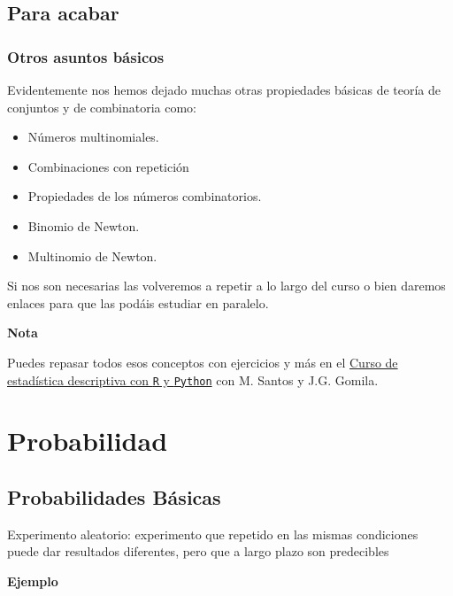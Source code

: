 \documentclass[]{book}
\providecommand{\tightlist}{%
  \setlength{\itemsep}{0pt}\setlength{\parskip}{0pt}}
\begin{document}
\hypertarget{para-acabar}{%
\section{Para acabar}\label{para-acabar}}

\hypertarget{otros-asuntos-buxe1sicos}{%
\subsection{Otros asuntos básicos}\label{otros-asuntos-buxe1sicos}}

Evidentemente nos hemos dejado muchas otras propiedades básicas de teoría de conjuntos y de combinatoria como:

\begin{itemize}
\tightlist
\item
  Números multinomiales.
\item
  Combinaciones con repetición
\item
  Propiedades de los números combinatorios.
\item
  Binomio de Newton.
\item
  Multinomio de Newton.
\end{itemize}

Si nos son necesarias las volveremos a repetir a lo largo del curso o bien daremos enlaces para que las podáis estudiar en paralelo.

\textbf{Nota}

Puedes repasar todos esos conceptos con ejercicios y más en el \href{https://www.udemy.com/course/estadistica-descriptiva?couponCode=JB_PROMO_OFF}{Curso de estadística descriptiva con \texttt{R} y \texttt{Python}} con M. Santos y J.G. Gomila.

\hypertarget{probabilidad}{%
\chapter{Probabilidad}\label{probabilidad}}

\hypertarget{probabilidades-buxe1sicas}{%
\section{Probabilidades Básicas}\label{probabilidades-buxe1sicas}}

 Experimento aleatorio: experimento que repetido en las mismas condiciones puede dar resultados diferentes, pero que a largo plazo son predecibles

\textbf{Ejemplo}
\end{document}
